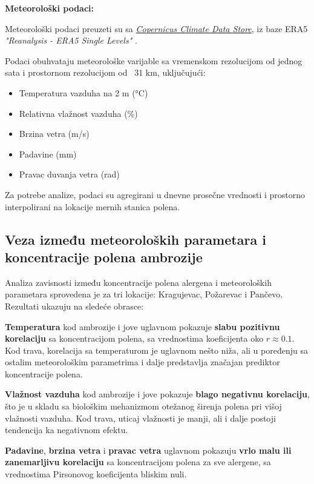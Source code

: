 \documentclass[12pt]{article}
\begin{document}
\textbf{Meteorološki podaci:}

Meteorološki podaci preuzeti su sa \href{https://cds.climate.copernicus.eu/datasets/reanalysis-era5-single-levels?tab=overview}{\textit{Copernicus Climate Data Store}}, iz baze ERA5 \textit{"Reanalysis - ERA5 Single Levels"} \cite{hersbach2020}.

Podaci obuhvataju meteorološke varijable sa vremenskom rezolucijom od jednog sata i prostornom rezolucijom od ~31 km, uključujući:

\begin{itemize}
    \item Temperatura vazduha na 2 m (°C)
    \item Relativna vlažnost vazduha (\%)
    \item Brzina vetra (m/s)
    \item Padavine (mm)
    \item Pravac duvanja vetra (rad)
\end{itemize}

Za potrebe analize, podaci su agregirani u dnevne prosečne vrednosti i prostorno interpolirani na lokacije mernih stanica polena.

\subsection{Veza između meteoroloških parametara i koncentracije polena ambrozije}


Analiza zavisnosti između koncentracije polena alergena i meteoroloških parametara sprovedena je za tri lokacije: Kragujevac, Požarevac i Pančevo. Rezultati ukazuju na sledeće obrasce:

\textbf{Temperatura} kod ambrozije i jove uglavnom pokazuje \textbf{slabu pozitivnu korelaciju} sa koncentracijom polena, sa vrednostima koeficijenta oko $r \approx 0.1$. Kod trava, korelacija sa temperaturom je uglavnom nešto niža, ali u poređenju sa ostalim meteorološkim parametrima i dalje predstavlja značajan prediktor koncentracije polena.

\textbf{Vlažnost vazduha} kod ambrozije i jove pokazuje \textbf{blago negativnu korelaciju}, što je u skladu sa biološkim mehanizmom otežanog širenja polena pri višoj vlažnosti vazduha. Kod trava, uticaj vlažnosti je manji, ali i dalje postoji tendencija ka negativnom efektu.

\textbf{Padavine}, \textbf{brzina vetra} i \textbf{pravac vetra} uglavnom pokazuju \textbf{vrlo malu ili zanemarljivu korelaciju} sa koncentracijom polena za sve alergene, sa vrednostima Pirsonovog koeficijenta bliskim nuli.
\end{document}
